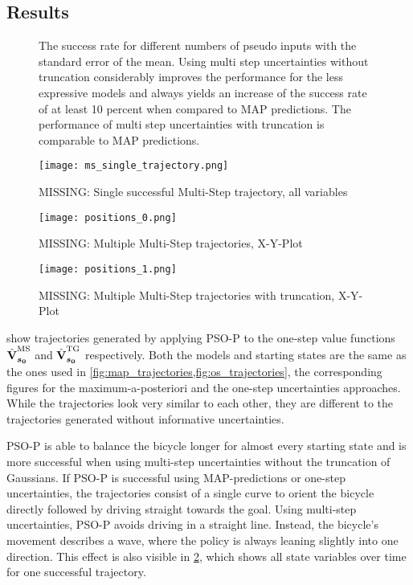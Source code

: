 \subsection{Results}
\begin{figure}[p]
    \centering
    \caption[Results using multi step uncertainties]{
        The success rate for different numbers of pseudo inputs with the standard error of the mean.
        Using multi step uncertainties without truncation considerably improves the performance for the less expressive models and always yields an increase of the success rate of at least 10 percent when compared to MAP predictions.
        The performance of multi step uncertainties with truncation is comparable to MAP predictions.
    }
    \label{fig:ms_results}
\end{figure}
\begin{figure}[p]
    \centering
    \texttt{[image: ms\_single\_trajectory.png]}
    \caption{MISSING: Single successful Multi-Step trajectory, all variables}
    \label{fig:ms_successful_trajectory}
\end{figure}
\begin{figure}[p]
    \centering
    \texttt{[image: positions\_0.png]}
    \caption{MISSING: Multiple Multi-Step trajectories, X-Y-Plot}
    \label{fig:ms_trajectories}
\end{figure}
\begin{figure}[p]
    \centering
    \texttt{[image: positions\_1.png]}
    \caption{MISSING: Multiple Multi-Step trajectories with truncation, X-Y-Plot}
    \label{fig:ms_truncation_trajectories}
\end{figure}
 show trajectories generated by applying PSO-P to the one-step value functions $\operatorname{\hat{\operatorname{\mathbf{V}}}}^{\text{MS}}_{\bm{s_0}}$ and $\operatorname{\hat{\operatorname{\mathbf{V}}}}^{\text{TG}}_{\bm{s_0}}$ respectively.
Both the models and starting states are the same as the ones used in \cref{fig:map_trajectories,fig:os_trajectories}, the corresponding figures for the maximum-a-posteriori and the one-step uncertainties approaches.
While the trajectories look very similar to each other, they are different to the trajectories generated without informative uncertainties.

PSO-P is able to balance the bicycle longer for almost every starting state and is more successful when using multi-step uncertainties without the truncation of Gaussians.
If PSO-P is successful using MAP-predictions or one-step uncertainties, the trajectories consist of a single curve to orient the bicycle directly followed by driving straight towards the goal.
Using multi-step uncertainties, PSO-P avoids driving in a straight line.
Instead, the bicycle's movement describes a wave, where the policy is always leaning slightly into one direction.
This effect is also visible in \cref{fig:ms_successful_trajectory}, which shows all state variables over time for one successful trajectory.

